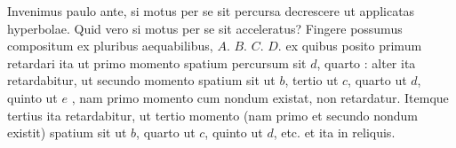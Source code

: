     \pend
    \pstart
\noindent {}%
        \pend
        \vspace{1.5em}
\pstart
Invenimus paulo ante, si motus per se sit
percursa decrescere ut applicatas hyperbolae.
Quid vero si motus per se sit acceleratus?
Fingere possumus compositum ex pluribus aequabilibus,
$\displaystyle A.$ $\displaystyle B.$ $\displaystyle C.$ $\displaystyle D.$
ex quibus posito primum retardari ita ut primo momento spatium percursum sit
$\displaystyle d$, quarto
:
alter ita retardabitur, ut secundo momento spatium sit ut $\displaystyle b$, tertio ut $\displaystyle c$, quarto ut $\displaystyle d$, quinto ut $\displaystyle e$
,
nam primo momento cum nondum existat, non retardatur.
Itemque tertius ita retardabitur, ut tertio momento (nam primo et secundo nondum existit) spatium sit ut $\displaystyle b$, quarto ut $\displaystyle c$, quinto ut $\displaystyle d$, etc.
et ita in reliquis.\\
\hspace*{7,5mm}

